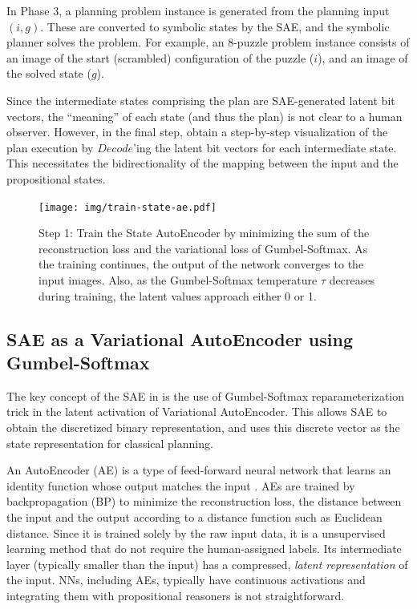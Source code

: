 In Phase 3, a planning problem instance is generated from the planning input $(i,g)$.
These are converted to symbolic states by the SAE, and the symbolic planner solves the problem.
For example, an 8-puzzle problem instance consists of an image of the start (scrambled) configuration of the puzzle ($i$), and an image of the solved state ($g$).

Since the intermediate states comprising the plan are SAE-generated latent bit vectors, the ``meaning'' of each state (and thus the plan) is not clear to a human observer.
However, in the final step, \latentplanner obtain a step-by-step visualization of the plan execution
by $Decode$'ing the latent bit vectors for each intermediate state.
This necessitates the bidirectionality of the mapping between the input and the propositional states.

\begin{figure}[htb]
 \texttt{[image: img/train-state-ae.pdf]}
 \caption{Step 1:
Train the State AutoEncoder by
 minimizing the sum of the reconstruction loss and the variational loss of Gumbel-Softmax.
As the training continues, the output of the network converges to the input images.
Also, as the Gumbel-Softmax temperature $\tau$ decreases during training,
the latent values approach either 0 or 1.}
 \label{sae}
\end{figure}

\subsection{SAE as a Variational AutoEncoder using Gumbel-Softmax}

The key concept of the SAE in \latentplanner is the use of Gumbel-Softmax \cite{jang2016categorical}
reparameterization trick in the latent activation of Variational AutoEncoder.
This allows SAE to obtain the
discretized binary representation, and \latentplanner uses this
discrete vector as the state representation for classical planning.

An AutoEncoder (AE) is a type of feed-forward neural network that learns
an identity function whose output matches the input \cite{hinton2006reducing}.
AEs are trained by backpropagation (BP) to minimize the reconstruction loss,
the distance between the input and the output according to a distance function such as Euclidean distance.
Since it is trained solely by the raw input data, it is a unsupervised learning method that do not require the human-assigned labels.
Its intermediate layer (typically smaller than the input) has a compressed, \emph{latent representation} of the input.
NNs, including AEs, typically have continuous activations and integrating them with propositional reasoners is not straightforward.

